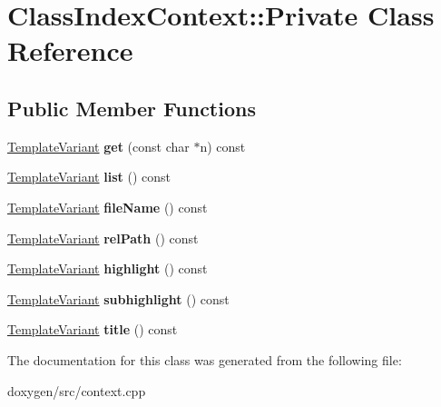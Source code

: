 \hypertarget{class_class_index_context_1_1_private}{}\section{Class\+Index\+Context\+::Private Class Reference}
\label{class_class_index_context_1_1_private}
\subsection*{Public Member Functions}
\begin{DoxyCompactItemize}
\item 
\mbox{\label{class_class_index_context_1_1_private_ad01de90005cca0da85a51f6196724ea3}} 
\mbox{\hyperlink{class_template_variant}{Template\+Variant}} {\bfseries get} (const char $\ast$n) const
\item 
\mbox{\label{class_class_index_context_1_1_private_ab7d15a283b2721f042c28b263584495e}} 
\mbox{\hyperlink{class_template_variant}{Template\+Variant}} {\bfseries list} () const
\item 
\mbox{\label{class_class_index_context_1_1_private_a466ea1822cff6788a5c4e3b0a85bae7c}} 
\mbox{\hyperlink{class_template_variant}{Template\+Variant}} {\bfseries file\+Name} () const
\item 
\mbox{\label{class_class_index_context_1_1_private_a0b92cb12e972b6fcccecde545d3ab4f6}} 
\mbox{\hyperlink{class_template_variant}{Template\+Variant}} {\bfseries rel\+Path} () const
\item 
\mbox{\label{class_class_index_context_1_1_private_a378e1056c31c5689d490d3f119e75f65}} 
\mbox{\hyperlink{class_template_variant}{Template\+Variant}} {\bfseries highlight} () const
\item 
\mbox{\label{class_class_index_context_1_1_private_afb2c8ad65d25b1e8b82cdbacfa6566fc}} 
\mbox{\hyperlink{class_template_variant}{Template\+Variant}} {\bfseries subhighlight} () const
\item 
\mbox{\label{class_class_index_context_1_1_private_a26fd0370bec07ef3124ec13094b39573}} 
\mbox{\hyperlink{class_template_variant}{Template\+Variant}} {\bfseries title} () const
\end{DoxyCompactItemize}


The documentation for this class was generated from the following file\+:\begin{DoxyCompactItemize}
\item 
doxygen/src/context.\+cpp\end{DoxyCompactItemize}

